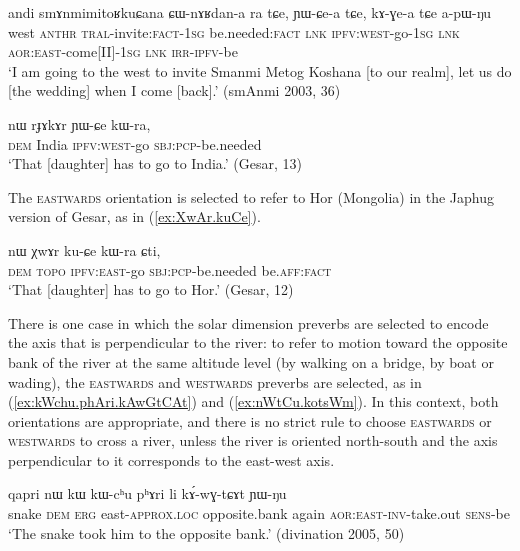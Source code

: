 \begin{exe}
\ex \label{ex:andi.smanmi}
\gll andi smɤnmimitoʁkuɕana ɕɯ-nɤʁdan-a ra tɕe, ɲɯ-ɕe-a tɕe, kɤ-ɣe-a tɕe a-pɯ-ŋu \\
west  \textsc{anthr} \textsc{tral}-invite:\textsc{fact}-\textsc{1sg} be.needed:\textsc{fact} \textsc{lnk} \textsc{ipfv}:\textsc{west}-go-\textsc{1sg} \textsc{lnk} \textsc{aor}:\textsc{east}-come[II]-\textsc{1sg} \textsc{lnk} \textsc{irr}-\textsc{ipfv}-be \\
\glt `I am going to the west to invite Smanmi Metog Koshana [to our realm], let us do [the wedding] when I come [back].' (smAnmi 2003, 36)
\end{exe}

\begin{exe}
\ex \label{ex:rJAkAr.YWCe}
\gll nɯ rɟɤkɤr ɲɯ-ɕe kɯ-ra, \\
\textsc{dem} India \textsc{ipfv}:\textsc{west}-go \textsc{sbj}:\textsc{pcp}-be.needed \\
\glt `That [daughter] has to go to India.' (Gesar, 13)
\end{exe}

The \textsc{eastwards} orientation is selected to refer to Hor (Mongolia) in the Japhug version of Gesar, as in (\ref{ex:XwAr.kuCe}).

\begin{exe}
\ex \label{ex:XwAr.kuCe}
\gll  nɯ χwɤr ku-ɕe kɯ-ra ɕti, \\
\textsc{dem}  \textsc{topo} \textsc{ipfv}:\textsc{east}-go \textsc{sbj}:\textsc{pcp}-be.needed be.\textsc{aff}:\textsc{fact} \\
\glt `That [daughter] has to go to Hor.' (Gesar, 12)
\end{exe} 


There is one case in which the solar dimension preverbs are selected to encode the axis that is perpendicular to the river: to refer to motion toward the opposite bank of the river at the same altitude level (by walking on a bridge, by boat or wading), the \textsc{eastwards} and \textsc{westwards} preverbs are selected, as in (\ref{ex:kWchu.phAri.kAwGtCAt}) and (\ref{ex:nWtCu.kotsWm}). In this context, both orientations are appropriate, and there is no strict rule to choose \textsc{eastwards} or \textsc{westwards} to cross a river, unless the river is oriented north-south and the axis perpendicular to it corresponds to the east-west axis.

\begin{exe}
\ex \label{ex:kWchu.phAri.kAwGtCAt}
\gll  qapri nɯ kɯ kɯ-cʰu pʰɤri li kɤ́-wɣ-tɕɤt ɲɯ-ŋu \\
snake \textsc{dem} \textsc{erg} east-\textsc{approx}.\textsc{loc} opposite.bank again \textsc{aor}:\textsc{east}-\textsc{inv}-take.out \textsc{sens}-be \\
\glt `The snake took him to the opposite bank.' (divination 2005, 50)
\end{exe} 

